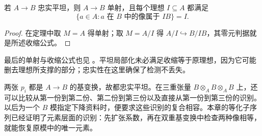 \begin{corollary}\label{g5:cor:faithful-flat-contraction}
	若 \(A\to B\) 忠实平坦，则 \(A\to B\) 单射，且每个理想 \(I\subseteq A\) 都满足
	\[
		\{a\in A:a\text{ 在 }B\text{ 中的像属于 }IB\}=I.
	\]
\end{corollary}
\begin{proof}
	在定理中取 \(M=A\) 得单射；取 \(M=A/I\) 得
	\(A/I\hookrightarrow B/IB\)，其零元判据就是所述收缩公式。
\end{proof}

最后的单射与收缩公式也见 \cite[第7节，定理7.5，第49页]{Matsumura1989}。平坦局部化未必满足收缩等于原理想，因为它可能删去理想所支撑的部分；忠实性在这里确保了检测不丢失。

\ProseParagraphBreak

两张 \(p_i\) 都是 \(A\to B\) 的基变换，故都忠实平坦。在三重张量 \(B\otimes_A B\otimes_A B\) 上，还可以比较从第一份到第二份、第二份到第三份以及直接从第一份到第三份的识别。以后为一个 \(B\) 模指定下降资料时，便要求这些识别的复合相容。本章的等化子序列已经证明了元素层面的识别：先扩张系数，再在双重基变换中检查两种像相等，就能恢复原模中的唯一元素。
